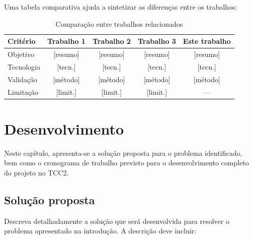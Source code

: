 \documentclass[
    12pt,                %
    openright,           %
    oneside,             %
    a4paper,             %
    english,             %
    brazil               %
]{abntex2}
\begin{document}
\vspace{0.5cm}

Uma tabela comparativa ajuda a sintetizar as diferenças entre os trabalhos:

\begin{table}[htb]
    \centering
    \caption{Comparação entre trabalhos relacionados}
    \label{tab:trabalhos_relacionados}
    \begin{tabular}{l|c|c|c|c}
        \toprule
        \textbf{Critério} & \textbf{Trabalho 1} & \textbf{Trabalho 2} & \textbf{Trabalho 3} & \textbf{Este trabalho} \\
        \midrule
        Objetivo           & [resumo]   & [resumo]   & [resumo]   & [resumo] \\
        \midrule
        Tecnologia         & [tecn.]    & [tecn.]    & [tecn.]    & [tecn.] \\
        \midrule
        Validação          & [método]   & [método]   & [método]   & [método] \\
        \midrule
        Limitação          & [limit.]   & [limit.]   & [limit.]   & --- \\
        \bottomrule
    \end{tabular}
\end{table}

\chapter{Desenvolvimento}
\label{cap:desenvolvimento}

Neste capítulo, apresenta-se a solução proposta para o problema identificado, bem como o cronograma de trabalho previsto para o desenvolvimento completo do projeto no TCC2.

\section{Solução proposta}
\label{sec:solucao}

Descreva detalhadamente a solução que será desenvolvida para resolver o problema apresentado na introdução. A descrição deve incluir:
\end{document}
